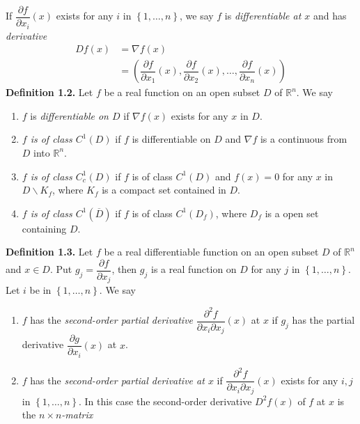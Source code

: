 \documentclass[a4paper]{article}
\numberwithin{equation}{section}
\begin{document}
If $\dfrac{{\partial f}}{{\partial {x_i}}}\left( x \right)$ exists for any $i$ in $\left\{ {1, \ldots ,n} \right\}$, we say $f$ is \textit{differentiable at $x$} and has \textit{derivative}
\begin{align}
Df\left( x \right) &= \nabla f\left( x \right)\\
& = \left( {\dfrac{{\partial f}}{{\partial {x_1}}}\left( x \right),\dfrac{{\partial f}}{{\partial {x_2}}}\left( x \right), \ldots ,\dfrac{{\partial f}}{{\partial {x_n}}}\left( x \right)} \right)
\end{align}
\textbf{Definition 1.2.} Let $f$ be a real function on an open subset $D$ of $\mathbb{R}^n$. We say
\begin{enumerate}
\item $f$ is \textit{differentiable on $D$} if $\nabla f\left( x \right)$ exists for any $x$ in $D$.
\item \textit{$f$ is of class $C^1\left(D\right)$} if $f$ is differentiable on $D$ and $\nabla f$ is a continuous from $D$ into $\mathbb{R}^n$.
\item \textit{$f$ is of class $C_c ^1\left(D\right)$} if $f$ is of class $C^1\left(D\right)$ and $f\left(x\right)=0$ for any $x$ in $D\backslash {K_f}$, where $K_f$ is a compact set contained in $D$.
\item \textit{$f$ is of class ${C^1}\left( {\overline D} \right)$} if $f$ is of class ${C^1}\left( {{D_f}} \right)$, where $D_f$ is a open set containing $D$.
\end{enumerate}
\textbf{Definition 1.3.} Let $f$ be a real differentiable function on an open subset $D$ of $\mathbb{R}^n$ and $x\in D$. Put ${g_j} = \dfrac{{\partial f}}{{\partial {x_j}}}$, then $g_j$ is a real function on $D$ for any $j$ in $\left\{ {1, \ldots ,n} \right\}$. Let $i$ be in $\left\{ {1, \ldots ,n} \right\}$. We say
\begin{enumerate}
\item $f$ has the \textit{second-order partial derivative} $\dfrac{{{\partial ^2}f}}{{\partial {x_i}\partial {x_j}}}\left( x \right)$ at $x$ if $g_j$ has the partial derivative $\dfrac{{\partial g}}{{\partial {x_i}}}\left( x \right)$ at $x$.
\item $f$ has the \textit{second-order partial derivative at $x$} if $\dfrac{{{\partial ^2}f}}{{\partial {x_i}\partial {x_j}}}\left( x \right)$ exists for any $i,j$ in $\left\{ {1, \ldots ,n} \right\}$. In this case the second-order derivative $D^2 f\left(x\right)$ of $f$ at $x$ is the $n\times n$\textit{-matrix}
\end{enumerate}
\end{document}
